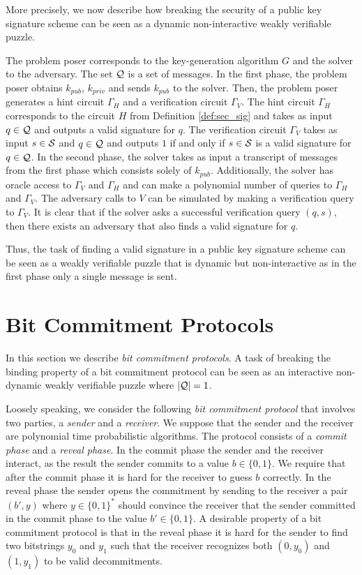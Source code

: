 More precisely, we now describe how breaking the security of a public key signature scheme can be
seen as a dynamic non-interactive weakly verifiable puzzle.

The problem poser corresponds to the key-generation algorithm $G$ and the solver to the adversary. The set $\mathcal{Q}$ is a set of messages.
In the first phase, the problem poser obtains $k_{pub}$, $k_{priv}$ and sends $k_{pub}$ to the solver.
Then, the problem poser generates a hint circuit $\Gamma_H$ and a verification circuit $\Gamma_V$.
The hint circuit $\Gamma_H$ corresponds to the circuit $H$ from Definition \ref{def:sec_sig} and takes as input $q \in \mathcal{Q}$ and outputs a valid signature for $q$.
The verification circuit $\Gamma_V$ takes as input $s \in \mathcal{S}$ and $q \in \mathcal{Q}$ and outputs $1$ if and only if $s \in \mathcal{S}$ is a valid signature for $q \in \mathcal{Q}$.
In the second phase, the solver takes as input a transcript of messages from the first phase which consists solely of $k_{pub}$.
Additionally, the solver has oracle access to $\Gamma_V$ and $\Gamma_H$ and can make a polynomial number of queries to $\Gamma_H$ and $\Gamma_V$.
The adversary calls to $V$ can be simulated by making a verification query to $\Gamma_V$.
It is clear that if the solver asks a successful verification query $(q,s)$,
then there exists an adversary that also finds a valid signature for $q$.

Thus, the task of finding a valid signature in a public key signature scheme can be seen as a weakly verifiable puzzle that
is dynamic but non-interactive as in the first phase only a single message is sent.

\section{Bit Commitment Protocols}
\label{section:bc}
In this section we describe \textit{bit commitment protocols}. A task of breaking the binding property of
a bit commitment protocol can be seen as an interactive non-dynamic weakly verifiable puzzle where $|\mathcal{Q}| = 1$.

Loosely speaking, we consider the following \textit{bit commitment protocol} that involves two parties, a \textit{sender} and a \textit{receiver}.
We suppose that the sender and the receiver are polynomial time probabilistic algorithms.
The protocol consists of a \textit{commit phase} and a \textit{reveal phase}.
In the commit phase the sender and the receiver interact, as the result the sender commits to a value $b \in \{0,1\}$.
We require that after the commit phase it is hard for the receiver to guess $b$ correctly.
In the reveal phase the sender opens the commitment by sending to the receiver a pair $(b', y)$ where $y \in \{0,1\}^{*}$
should convince the receiver that the sender committed in the commit phase to the value $b' \in \{0,1\}$.
A desirable property of a bit commitment protocol is that in the reveal phase it is hard for
the sender to find two bitstrings $y_0$ and $y_1$ such that the receiver recognizes both $(0,y_0)$ and $(1, y_1)$ to be valid decommitments.

